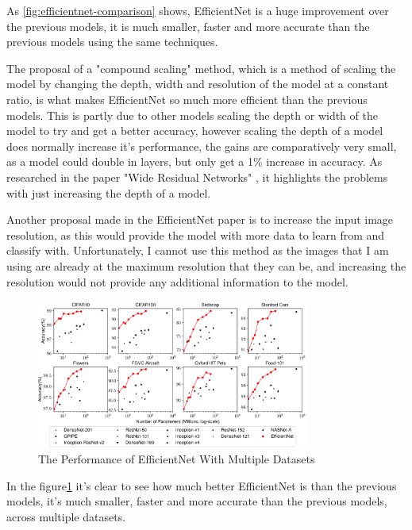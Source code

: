 \documentclass[]{final_report}
\begin{document}
As \ref{fig:efficientnet-comparison} shows, EfficientNet is a huge improvement over the previous models, it is much smaller, faster and more accurate than the previous models using the same techniques.

The proposal of a "compound scaling" method, which is a method of scaling the model by changing the depth, width and resolution of the model at a constant ratio, is what makes EfficientNet so much more efficient than the previous models. This is partly due to other models scaling the depth or width of the model to try and get a better accuracy, however scaling the depth of a model does normally increase it's performance, the gains are comparatively very small, as a model could double in layers, but only get a 1\% increase in accuracy. As researched in the paper "Wide Residual Networks" \cite{BMVC2016_87}, it highlights the problems with just increasing the depth of a model.

Another proposal made in the EfficientNet paper is to increase the input image resolution, as this would provide the model with more data to learn from and classify with. Unfortunately, I cannot use this method as the images that I am using are already at the maximum resolution that they can be, and increasing the resolution would not provide any additional information to the model.

\begin{figure}[ht!]
  \centering
  \includegraphics[width=0.8\textwidth]{images/EfficientNetPerformanceDatasets.PNG}
  \caption{The Performance of EfficientNet With Multiple Datasets\cite{tan2020efficientnet}}
  \label{fig:efficientnet-performance-with-multiple-datasets}
\end{figure}

In the figure\ref{fig:efficientnet-performance-with-multiple-datasets} it's clear to see how much better EfficientNet is than the previous models, it's much smaller, faster and more accurate than the previous models, across multiple datasets.
\end{document}
